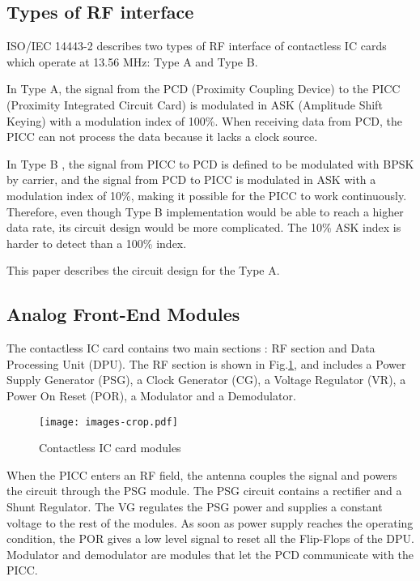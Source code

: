 \subsection{Types of RF interface}
ISO/IEC 14443-2 describes two types of RF interface of contactless IC cards which operate at 13.56 MHz: Type A and Type B. 

In Type A, the signal from the PCD (Proximity Coupling Device) to the PICC (Proximity Integrated Circuit Card) is modulated in ASK (Amplitude Shift Keying) with a modulation index of 100\%. When receiving data from PCD, the PICC can not process the data because it lacks a clock source. 

In Type B \cite{rfid_transponder},  the signal from PICC to PCD is defined to be modulated with BPSK by carrier, and the signal from PCD to PICC is modulated in ASK with a modulation index of 10\%, making it possible for the PICC to work continuously. Therefore, even though Type B implementation would be able to reach a higher data rate, its circuit design would be more complicated. The 10\% ASK index is harder to detect than a 100\% index.

This paper describes the circuit design for the Type A. 


\subsection{Analog Front-End Modules}

The contactless IC card contains two main sections \cite{rfid_interface}: RF section and Data Processing Unit (DPU). The RF section is shown in Fig.\ref{fig:modules}, and includes a Power Supply Generator (PSG), a Clock Generator (CG), a Voltage Regulator (VR), a Power On Reset (POR), a Modulator  and a Demodulator. 

\begin{figure}[]
  \centering
  \texttt{[image: images-crop.pdf]}
  \caption{Contactless IC card modules}
  \label{fig:modules}
\end{figure}

When the PICC enters an RF field, the antenna couples the signal and powers the circuit through the PSG module. The PSG circuit contains a rectifier and a Shunt Regulator. The VG regulates the PSG power and supplies a constant voltage to the rest of the modules. As soon as power supply reaches the operating condition, the POR gives a low level signal to reset all the Flip-Flops of the DPU. Modulator and demodulator are modules that let the PCD communicate with the PICC.